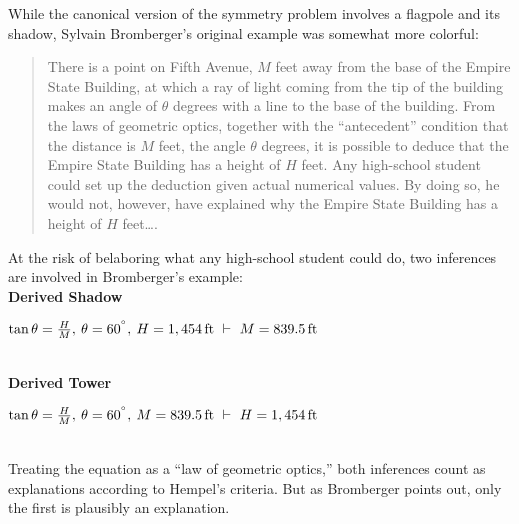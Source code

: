 \documentclass[natbib]{svjour3}                     %
\newcommand{\degree}{\ensuremath{^\circ}}
\begin{document}
While the canonical version of the symmetry problem involves a flagpole and its shadow, Sylvain Bromberger's original example was somewhat more colorful:

\begin{quote}
	There is a point on Fifth Avenue, $M$ feet away from the base of the
	Empire State Building, at which a ray of light coming from the tip of the
	building makes an angle of $\theta$ degrees with a line to the base of the
	building. From the laws of geometric optics, together with the ``antecedent''
	condition that the distance is $M$ feet, the angle $\theta$ degrees, it is
	possible to deduce that the Empire State Building has a height of $H$ feet.
	Any high-school student could set up the deduction given actual
	numerical values. By doing so, he would not, however, have explained
	why the Empire State Building has a height of $H$ feet\ldots \citep[p.92]{Bromberger1966}.
\end{quote}

\noindent At the risk of belaboring what any high-school student could do, two inferences are involved in Bromberger's example:\\

\noindent \label{eq:shadow_expl}\textbf{Derived Shadow}\hspace{8mm}\begin{minipage}[t]{.8\textwidth}
	$\tan \theta  = \frac{H}{M},\hspace{.5ex} \theta = 60^{\degree},\hspace{.5ex} H = 1,454\,\text{ft} \,\,\vdash\,\, M = 839.5\,\text{ft}$
\end{minipage}\\ 

\noindent \label{eq:height_expl}\textbf{Derived Tower}\hspace{10.5mm}\begin{minipage}[t]{.8\textwidth}
	$\tan \theta  = \frac{H}{M},\hspace{.5ex} \theta = 60^{\degree},\hspace{.5ex}  M = 839.5\,\text{ft} \,\,\vdash\,\,  H = 1,454\,\text{ft}$
\end{minipage}\\

\noindent Treating the equation as a ``law of geometric optics,'' both inferences count as explanations according to Hempel's criteria. But as Bromberger points out, only the first is plausibly an explanation. 
\end{document}
